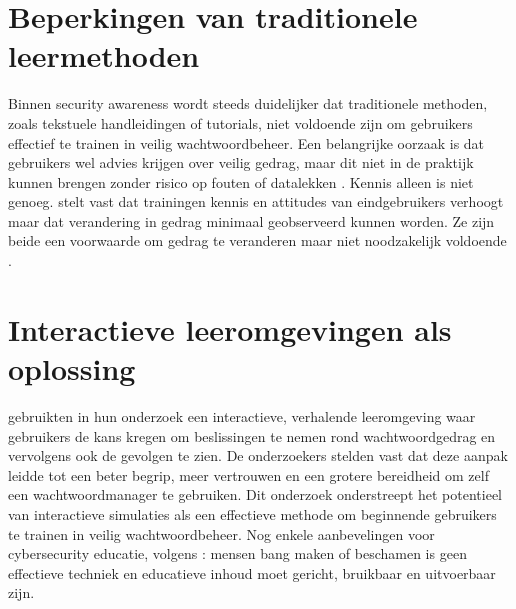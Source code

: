 \section{Beperkingen van traditionele leermethoden}

Binnen security awareness wordt steeds duidelijker dat traditionele methoden, zoals tekstuele handleidingen of tutorials, niet voldoende zijn om gebruikers effectief te trainen in veilig wachtwoordbeheer. Een belangrijke oorzaak is dat gebruikers wel advies krijgen over veilig gedrag, maar dit niet in de praktijk kunnen brengen zonder risico op fouten of datalekken \autocite{Sugatan2020}. 
Kennis alleen is niet genoeg. \textcite{Pruemmer2025} stelt vast dat trainingen kennis en attitudes van eindgebruikers verhoogt maar dat verandering in gedrag minimaal geobserveerd kunnen worden. Ze zijn beide een voorwaarde om gedrag te veranderen maar niet noodzakelijk voldoende \autocite{Bada2015}. 

\section{Interactieve leeromgevingen als oplossing}

\textcite{Sugatan2020} gebruikten in hun onderzoek een interactieve, verhalende leeromgeving waar gebruikers de kans kregen om beslissingen te nemen rond wachtwoordgedrag en vervolgens ook de gevolgen te zien. De onderzoekers stelden vast dat deze aanpak leidde tot een beter begrip, meer vertrouwen en een grotere bereidheid om zelf een wachtwoordmanager te gebruiken.
 Dit onderzoek onderstreept het potentieel van interactieve simulaties als een effectieve methode om beginnende gebruikers te trainen in veilig wachtwoordbeheer. Nog enkele aanbevelingen voor cybersecurity educatie, volgens \textcite{Geller2025}: mensen bang maken of beschamen is geen effectieve techniek en educatieve inhoud moet gericht, bruikbaar en uitvoerbaar zijn.

 

